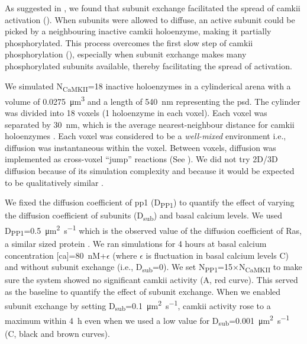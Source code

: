 \documentclass[9pt,lineno,doublespacing]{elife}
\newcommand\SUB[2]{#1\textsubscript{#2}}
\begin{document}
As suggested in \citep{stratton_activation-triggered_2014}, we found that
subunit exchange facilitated the spread of \gls{camkii} activation
(). When subunits were allowed to diffuse, an
active subunit could be picked by a neighbouring inactive \gls{camkii}
holoenzyme, making it partially phosphorylated. This process overcomes the first
slow step of \gls{camkii} phosphorylation (), especially when
subunit exchange makes many phosphorylated subunits available, thereby
facilitating the spread of activation.

We simulated \SUB{N}{CaMKII}=18 inactive holoenzymes in a cylinderical arena
with a volume of \SI{0.0275}{\cubic\micro\meter} and a length of
\SI{540}{\nano\meter} representing the \gls{psd}. The cylinder was divided into
18 voxels (1 holoenzyme in each voxel). Each voxel was separated by
\SI{30}{\nano\meter}, which is the average nearest-neighbour distance for
\gls{camkii} holoenzymes \citep{feng_quantitative_2011}. Each voxel was
considered to be a \emph{well-mixed} environment i.e., diffusion was
instantaneous within the voxel. Between voxels, diffusion was implemented as
cross-voxel ``jump'' reactions (See ). We did
not try 2D/3D diffusion because of its simulation complexity and because it
would be expected to be qualitatively similar \citep{fange_stochastic_2010}.

We fixed the diffusion coefficient of \gls{pp1} (\SUB{D}{PP1}) to quantify the
effect of varying the diffusion coefficient of subunits (\SUB{D}{sub}) and basal
calcium levels. We used \SUB{D}{PP1}=\SI{0.5}{\micro\meter\squared\per\second}
which is the observed value of the diffusion coefficient of Ras, a similar sized
protein \citep{harvey_spread_2008}. We ran simulations for 4 hours at basal
calcium concentration [\gls{ca}]=\SI{80}{\nano M}+$\epsilon$ (where $\epsilon$
is fluctuation in basal calcium levels C) and without subunit
exchange (i.e., \SUB{D}{sub}=0). We set \SUB{N}{PP1}=15$\times$\SUB{N}{CaMKII}
to make sure the system showed no significant \gls{camkii} activity
(A, red curve). This served as the baseline to
quantify the effect of subunit exchange. When we enabled subunit exchange by
setting \SUB{D}{sub}=\SI{0.1}{\micro\meter\squared\per\second}, \gls{camkii}
activity rose to a maximum within \SI{4}{\hour} even when we used a low value
for \SUB{D}{sub}=\SI{0.001}{\micro\meter\squared\per\second}
(C, black and brown curves).
\end{document}
